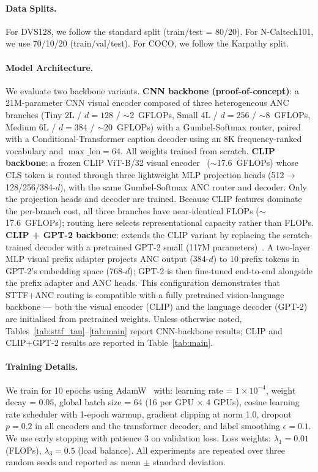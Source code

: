 \documentclass{article}
\begin{document}
\paragraph{Data Splits.}
For DVS128, we follow the standard split (train/test = 80/20).
For N-Caltech101, we use 70/10/20 (train/val/test).
For COCO, we follow the Karpathy split.

\paragraph{Model Architecture.}
We evaluate two backbone variants.
\textbf{CNN backbone (proof-of-concept)}: a 21M-parameter CNN visual encoder composed of three heterogeneous ANC branches (Tiny 2L / $d{=}128$ / $\sim$2~GFLOPs, Small 4L / $d{=}256$ / $\sim$8~GFLOPs, Medium 6L / $d{=}384$ / $\sim$20~GFLOPs) with a Gumbel-Softmax router, paired with a Conditional-Transformer caption decoder using an 8K frequency-ranked vocabulary and $\max\_{\text{len}}{=}64$. All weights trained from scratch.
\textbf{CLIP backbone}: a frozen CLIP ViT-B/32 visual encoder~\cite{radford2021clip} ($\sim$17.6~GFLOPs) whose CLS token is routed through three lightweight MLP projection heads (512$\to$128/256/384-$d$), with the same Gumbel-Softmax ANC router and decoder. Only the projection heads and decoder are trained. Because CLIP features dominate the per-branch cost, all three branches have near-identical FLOPs ($\sim$17.6~GFLOPs); routing here selects representational capacity rather than FLOPs.
\textbf{CLIP + GPT-2 backbone}: extends the CLIP variant by replacing the scratch-trained decoder with a pretrained GPT-2 small (117M parameters)~\cite{radford2019gpt2}. A two-layer MLP visual prefix adapter projects ANC output (384-$d$) to 10 prefix tokens in GPT-2's embedding space (768-$d$); GPT-2 is then fine-tuned end-to-end alongside the prefix adapter and ANC heads. This configuration demonstrates that STTF+ANC routing is compatible with a fully pretrained vision-language backbone — both the visual encoder (CLIP) and the language decoder (GPT-2) are initialised from pretrained weights. Unless otherwise noted, Tables~\ref{tab:sttf_tau}--\ref{tab:main} report CNN-backbone results; CLIP and CLIP+GPT-2 results are reported in Table~\ref{tab:main}.

\paragraph{Training Details.}
We train for 10 epochs using AdamW~\cite{loshchilov2019adamw} with:
learning rate = $1 \times 10^{-4}$,
weight decay = $0.05$,
global batch size = 64 (16 per GPU $\times$ 4 GPUs),
cosine learning rate scheduler with 1-epoch warmup,
gradient clipping at norm 1.0,
dropout $p=0.2$ in all encoders and the transformer decoder,
and label smoothing $\epsilon=0.1$.
We use early stopping with patience 3 on validation loss.
Loss weights: $\lambda_1=0.01$ (FLOPs), $\lambda_3=0.5$ (load balance).
All experiments are repeated over three random seeds and reported as mean $\pm$ standard deviation.
\end{document}
